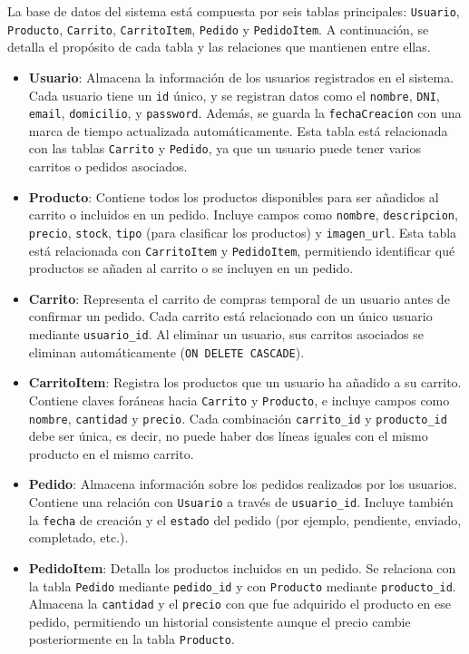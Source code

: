 \documentclass[10pt]{book}
\begin{document}
    La base de datos del sistema está compuesta por seis tablas principales: \texttt{Usuario}, \texttt{Producto}, \texttt{Carrito}, \texttt{CarritoItem}, \texttt{Pedido} y \texttt{PedidoItem}. A continuación, se detalla el propósito de cada tabla y las relaciones que mantienen entre ellas.
    
    \begin{itemize}
        \item \textbf{Usuario}: Almacena la información de los usuarios registrados en el sistema. Cada usuario tiene un \texttt{id} único, y se registran datos como el \texttt{nombre}, \texttt{DNI}, \texttt{email}, \texttt{domicilio}, y \texttt{password}. Además, se guarda la \texttt{fechaCreacion} con una marca de tiempo actualizada automáticamente. Esta tabla está relacionada con las tablas \texttt{Carrito} y \texttt{Pedido}, ya que un usuario puede tener varios carritos o pedidos asociados.
        
        \item \textbf{Producto}: Contiene todos los productos disponibles para ser añadidos al carrito o incluidos en un pedido. Incluye campos como \texttt{nombre}, \texttt{descripcion}, \texttt{precio}, \texttt{stock}, \texttt{tipo} (para clasificar los productos) y \texttt{imagen\_url}. Esta tabla está relacionada con \texttt{CarritoItem} y \texttt{PedidoItem}, permitiendo identificar qué productos se añaden al carrito o se incluyen en un pedido.
        
        \item \textbf{Carrito}: Representa el carrito de compras temporal de un usuario antes de confirmar un pedido. Cada carrito está relacionado con un único usuario mediante \texttt{usuario\_id}. Al eliminar un usuario, sus carritos asociados se eliminan automáticamente (\texttt{ON DELETE CASCADE}).
        
        \item \textbf{CarritoItem}: Registra los productos que un usuario ha añadido a su carrito. Contiene claves foráneas hacia \texttt{Carrito} y \texttt{Producto}, e incluye campos como \texttt{nombre}, \texttt{cantidad} y \texttt{precio}. Cada combinación \texttt{carrito\_id} y \texttt{producto\_id} debe ser única, es decir, no puede haber dos líneas iguales con el mismo producto en el mismo carrito.
        
        \item \textbf{Pedido}: Almacena información sobre los pedidos realizados por los usuarios. Contiene una relación con \texttt{Usuario} a través de \texttt{usuario\_id}. Incluye también la \texttt{fecha} de creación y el \texttt{estado} del pedido (por ejemplo, pendiente, enviado, completado, etc.).
        
        \item \textbf{PedidoItem}: Detalla los productos incluidos en un pedido. Se relaciona con la tabla \texttt{Pedido} mediante \texttt{pedido\_id} y con \texttt{Producto} mediante \texttt{producto\_id}. Almacena la \texttt{cantidad} y el \texttt{precio} con que fue adquirido el producto en ese pedido, permitiendo un historial consistente aunque el precio cambie posteriormente en la tabla \texttt{Producto}.
    \end{itemize}
    
\end{document}
